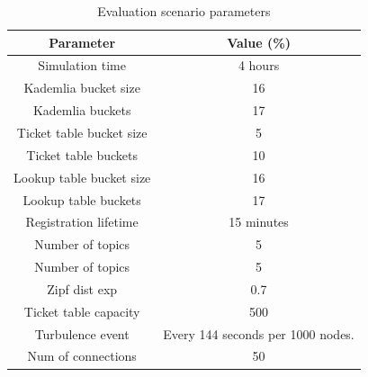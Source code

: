 \begin{table}[!hbt]
\centering
\scriptsize
\begin{tabular}{|c|c|}%
\hline
Parameter     & Value (\%) \\
\hline
\hline
Simulation time & 4 hours \\%
\hline
Kademlia bucket size & 16 \\%
\hline
Kademlia buckets & 17 \\%
\hline
Ticket table bucket size & 5 \\%
\hline
Ticket table buckets & 10 \\%
\hline
Lookup table bucket size & 16 \\%
\hline
Lookup table buckets & 17 \\%
\hline
Registration lifetime & 15 minutes \\%
\hline
Number of topics & 5 \\%
\hline
Number of topics & 5 \\%
\hline
Zipf dist exp & 0.7 \\%
\hline
Ticket table capacity & 500 \\
\hline
Turbulence event & Every 144 seconds per 1000 nodes. \\%
\hline
Num of connections & 50 \\%
\hline
\bottomrule
\end{tabular}
\vspace{2mm}
\caption{Evaluation scenario parameters}
\label{tab:param}
\vspace{-0.05in}
\end{table}

